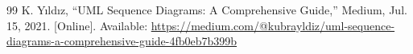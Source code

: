 \begin{thebibliography}{99}
 K. Yıldız, ``UML Sequence Diagrams: A Comprehensive Guide,'' Medium, Jul. 15, 2021. [Online]. Available: \url{https://medium.com/@kubrayldiz/uml-sequence-diagrams-a-comprehensive-guide-4fb0eb7b399b}





\end{thebibliography}
